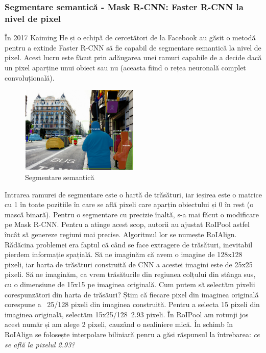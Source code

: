 \subsubsection{Segmentare semantică - Mask R-CNN: Faster R-CNN la nivel de pixel}
În 2017 Kaiming He și o echipă de cercetători de la Facebook au găsit o metodă pentru a extinde Faster R-CNN să fie capabil de segmentare semantică la nivel de pixel. Acest lucru este făcut prin adăugarea unei ramuri capabile de a decide dacă un pixel aparține unui obiect sau nu (aceasta fiind o rețea neuronală complet convoluțională).
\begin{figure}[h!]
    	\centering
	\captionsetup{justification=centering, margin=2cm}
	\includegraphics[width=0.5\textwidth]{figures/semantic_segmentation.png}
	\caption{Segmentare semantică \cite{DBLP:journals/corr/HeGDG17}}
	\label{fig:segmentare_semantica}
\end{figure}
Intrarea ramurei de segmentare este o hartă de trăsături, iar ieșirea este o matrice cu 1 în toate pozițiile în care se află pixeli care aparțin obiectului și 0 în rest (o mască binară). Pentru o segmentare cu precizie înaltă, s-a mai făcut o modificare pe Mask R-CNN. Pentru a atinge acest scop, autorii au ajustat RoIPool astfel încât să genereze regiuni mai precise. Algoritmul lor se numește RoIAlign.\newline
Rădăcina problemei era faptul că când se face extragere de trăsături, inevitabil pierdem informație spațială. Să ne imaginăm că avem o imagine de 128x128 pixeli, iar harta de trăsături construită de CNN a acestei imagini este de 25x25 pixeli. Să ne imaginăm, ca vrem trăsăturile din regiunea colțului din stânga sus, cu o dimensiune de 15x15 pe imaginea originală. Cum putem să selectăm pixelii corespunzători din harta de trăsăuri? Știm că fiecare pixel din imaginea originală corespune a ~25/128 pixeli din imaginea construită. Pentru a selecta 15 pixeli din imaginea originală, selectăm 15x25/128~2.93 pixeli.\newline
În RoIPool am rotunji jos acest număr și am alege 2 pixeli, cauzând o nealiniere mică. În schimb în RoIAlign se folosește interpolare biliniară penru a găsi răspunsul la întrebarea: \textit{ce se află la pixelul 2.93?}
